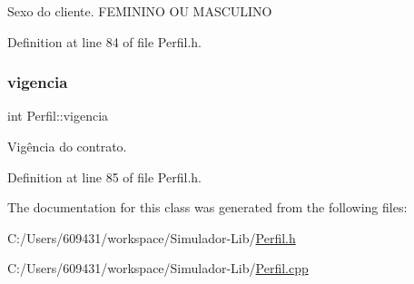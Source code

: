 Sexo do cliente. F\+E\+M\+I\+N\+I\+NO OU M\+A\+S\+C\+U\+L\+I\+NO 

Definition at line 84 of file Perfil.\+h.

\hypertarget{class_perfil_ad5fdbf33a924b01cb3e30c364fde8a56}{}\label{class_perfil_ad5fdbf33a924b01cb3e30c364fde8a56} 
\subsubsection{\texorpdfstring{vigencia}{vigencia}}
{\footnotesize\ttfamily int Perfil\+::vigencia\hspace{0.3cm}{\ttfamily [private]}}

Vigência do contrato. 

Definition at line 85 of file Perfil.\+h.



The documentation for this class was generated from the following files\+:\begin{DoxyCompactItemize}
\item 
C\+:/\+Users/609431/workspace/\+Simulador-\/\+Lib/\hyperlink{_perfil_8h}{Perfil.\+h}\item 
C\+:/\+Users/609431/workspace/\+Simulador-\/\+Lib/\hyperlink{_perfil_8cpp}{Perfil.\+cpp}\end{DoxyCompactItemize}
